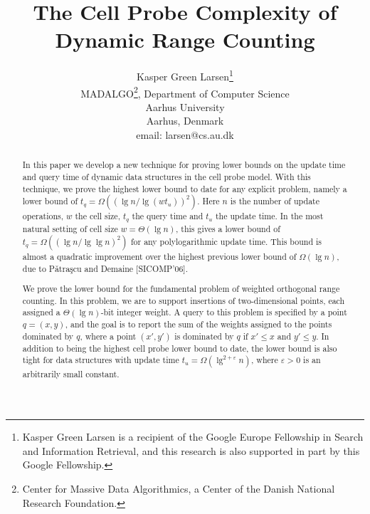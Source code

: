 \documentclass[letterpaper]{article}
\newcommand{\eps}{\varepsilon}
\begin{document}
\title{The Cell Probe Complexity of Dynamic Range Counting}


\author{
%
Kasper Green Larsen\thanks{Kasper Green Larsen is a recipient
    of the Google Europe Fellowship in Search and Information
    Retrieval, and this research is also supported in part by this
    Google Fellowship.}\\
       MADALGO\thanks{Center for Massive Data Algorithmics, a Center of the Danish National Research Foundation.}, Department of Computer Science\\
       Aarhus University\\
       Aarhus, Denmark\\
       email: larsen@cs.au.dk
}

\maketitle



\begin{abstract} 
In this paper we develop a new technique for proving lower bounds on
the update time and query time of dynamic data structures in the cell
probe model. With this technique, we prove the highest lower bound to
date for any explicit problem, namely a lower bound of
$t_q=\Omega((\lg n/\lg(wt_u))^2)$. Here $n$ is the number of update
operations, $w$ the cell size, $t_q$ the query time and $t_u$ the
update time. In the most natural setting of cell size $w=\Theta(\lg
n)$, this gives a lower bound of $t_q=\Omega((\lg n/\lg \lg n)^2)$ for
any polylogarithmic update time. This bound is almost a quadratic
improvement over the highest previous lower bound of $\Omega(\lg n)$,
due to P{\v a}tra{\c s}cu and Demaine [SICOMP'06].

We prove the lower bound for the fundamental problem of weighted
orthogonal range counting. In this problem, we are to support
insertions of two-dimensional points, each assigned a $\Theta(\lg
n)$-bit integer weight. A query to this problem is specified by a
point $q=(x,y)$, and the goal is to report the sum of the weights
assigned to the points dominated by $q$, where a point $(x',y')$ is
dominated by $q$ if $x' \leq x$ and $y' \leq y$. In addition to being
the highest cell probe lower bound to date, the lower bound is also
tight for data structures with update time $t_u =
\Omega(\lg^{2+\eps}n)$, where $\eps>0$ is an arbitrarily small
constant.
\end{abstract}
\end{document}

